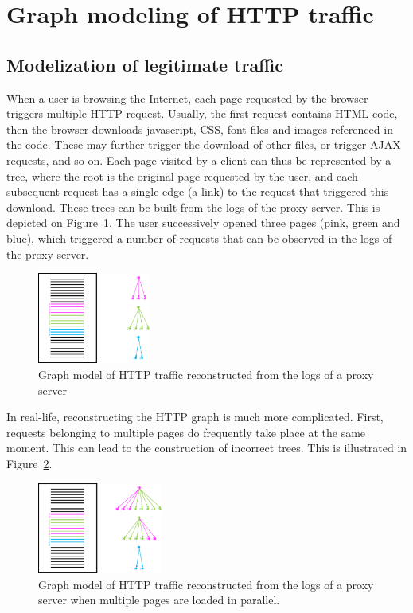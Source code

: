 \documentclass[conference]{IEEEtran}
\begin{document}
\section{Graph modeling of HTTP traffic}
\label{sec:model}

\subsection{Modelization of legitimate traffic}

When a user is browsing the Internet, each page requested by the browser triggers multiple HTTP request. Usually, the first request contains HTML code, then the browser downloads javascript, CSS, font files and images referenced in the code. These may further trigger the download of other files, or trigger AJAX requests, and so on. Each page visited by a client can thus be represented by a tree, where the root is the original page requested by the user, and each subsequent request has a single edge (a link) to the request that triggered this download. These trees can be built from the logs of the proxy server. This is depicted on Figure~\ref{fig:tree}. The user successively opened three pages (pink, green and blue), which triggered a number of requests that can be observed in the logs of the proxy server.

\begin{figure}
  \centering
  \includegraphics[height=85pt]{tree.eps}
  \caption{Graph model of HTTP traffic reconstructed from the logs of a proxy server}
  \label{fig:tree}
\end{figure}

In real-life, reconstructing the HTTP graph is much more complicated. First, requests belonging to multiple pages do frequently take place at the same moment. This can lead to the construction of incorrect trees. This is illustrated in Figure~\ref{fig:tree-multiple}.

\begin{figure}
  \centering
  \includegraphics[height=85pt]{tree-multiple.eps}
  \caption{Graph model of HTTP traffic reconstructed from the logs of a proxy server when multiple pages are loaded in parallel.}
  \label{fig:tree-multiple}
\end{figure}
\end{document}

